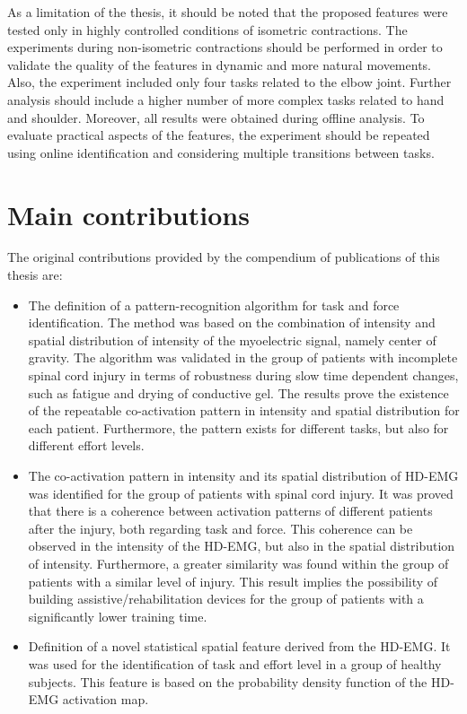 As a limitation of the thesis, it should be noted that the proposed features were tested only in highly controlled conditions of isometric contractions. The experiments during non-isometric contractions should be performed in order to validate the quality of the features in dynamic and more natural movements. Also, the experiment included only four tasks related to the elbow joint. Further analysis should include a higher number of more complex tasks related to hand and shoulder. Moreover, all results were obtained during offline analysis. To evaluate practical aspects of the features, the experiment should be repeated using online identification and considering multiple transitions between tasks.


\section{Main contributions}

The original contributions provided by the compendium of publications of this thesis are:

\begin{itemize}
\item The definition of a pattern-recognition algorithm for task and force identification. The method was based on the combination of intensity and spatial distribution of intensity of the myoelectric signal, namely center of gravity. The algorithm was validated in the group of patients with incomplete spinal cord injury in terms of robustness during slow time dependent changes, such as fatigue and drying of conductive gel. The results prove the existence of the repeatable co-activation pattern in intensity and spatial distribution for each patient. Furthermore, the pattern exists for different tasks, but also for different effort levels.

\item The co-activation pattern in intensity and its spatial distribution of HD-EMG was identified for the group of patients with spinal cord injury. It was proved that there is a coherence between activation patterns of different patients after the injury, both regarding task and force. This coherence can be observed in the intensity of the HD-EMG, but also in the spatial distribution of intensity. Furthermore, a greater similarity was found within the group of patients with a similar level of injury. This result implies the possibility of building assistive/rehabilitation devices for the group of patients with a significantly lower training time.

\item Definition of a novel statistical spatial feature derived from the HD-EMG. It was used for the identification of task and effort level in a group of healthy subjects. This feature is based on the probability density function of the HD-EMG activation map. 


\end{itemize}

